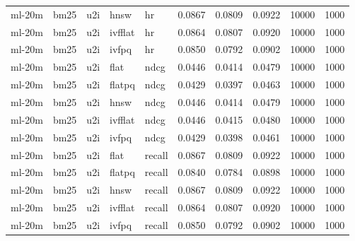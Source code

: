 \begin{tabular}{lllllrrrrr}
ml-20m & bm25 & u2i & hnsw & hr & 0.0867 & 0.0809 & 0.0922 & 10000 & 1000 \\
ml-20m & bm25 & u2i & ivfflat & hr & 0.0864 & 0.0807 & 0.0920 & 10000 & 1000 \\
ml-20m & bm25 & u2i & ivfpq & hr & 0.0850 & 0.0792 & 0.0902 & 10000 & 1000 \\
ml-20m & bm25 & u2i & flat & ndcg & 0.0446 & 0.0414 & 0.0479 & 10000 & 1000 \\
ml-20m & bm25 & u2i & flatpq & ndcg & 0.0429 & 0.0397 & 0.0463 & 10000 & 1000 \\
ml-20m & bm25 & u2i & hnsw & ndcg & 0.0446 & 0.0414 & 0.0479 & 10000 & 1000 \\
ml-20m & bm25 & u2i & ivfflat & ndcg & 0.0446 & 0.0415 & 0.0480 & 10000 & 1000 \\
ml-20m & bm25 & u2i & ivfpq & ndcg & 0.0429 & 0.0398 & 0.0461 & 10000 & 1000 \\
ml-20m & bm25 & u2i & flat & recall & 0.0867 & 0.0809 & 0.0922 & 10000 & 1000 \\
ml-20m & bm25 & u2i & flatpq & recall & 0.0840 & 0.0784 & 0.0898 & 10000 & 1000 \\
ml-20m & bm25 & u2i & hnsw & recall & 0.0867 & 0.0809 & 0.0922 & 10000 & 1000 \\
ml-20m & bm25 & u2i & ivfflat & recall & 0.0864 & 0.0807 & 0.0920 & 10000 & 1000 \\
ml-20m & bm25 & u2i & ivfpq & recall & 0.0850 & 0.0792 & 0.0902 & 10000 & 1000 \\
\bottomrule
\end{tabular}
